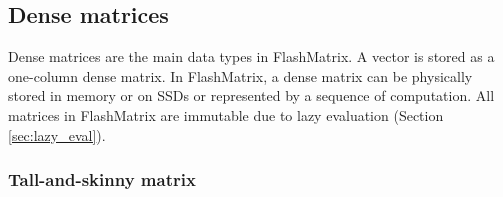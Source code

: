 

\subsection{Dense matrices}
Dense matrices are the main data types in FlashMatrix. A vector is stored
as a one-column dense matrix. In FlashMatrix, a dense matrix can be physically
stored in memory or on SSDs or represented by a sequence of computation.
All matrices in FlashMatrix are immutable due to lazy evaluation (Section
\ref{sec:lazy_eval}).


\subsubsection{Tall-and-skinny matrix} \label{sec:tas_mat}

